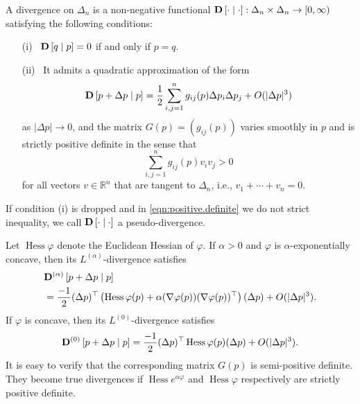 \documentclass[graybox]{svmult}
\newcommand{\Hess}{\operatorname{Hess}}
\begin{document}
\begin{definition} \label{def:divergence}
A divergence on $\Delta_n$ is a non-negative functional ${\bf D}\left[ \cdot \mid \cdot \right] : \Delta_n \times \Delta_n \rightarrow [0, \infty)$ satisfying the following conditions:
\begin{itemize}
\item[(i)] \ ${\bf D}\left[ q \mid p\right] = 0$ if and only if $p = q$.
\item[(ii)] \  It admits a quadratic approximation of the form
\begin{equation} \label{eqn:Riemannian}
{\bf D}\left[p + \Delta p \mid p\right] = \frac{1}{2} \sum_{i, j = 1}^n g_{ij}(p) \Delta p_i \Delta p_j + O(| \Delta p |^3)
\end{equation}
as $|\Delta p| \rightarrow 0$, and the matrix $G(p) = \left( g_{ij}(p) \right)$ varies smoothly in $p$ and is strictly positive definite in the sense that
\begin{equation} \label{eqn:positive.definite}
\sum_{i, j = 1}^n g_{ij}(p) v_i v_j > 0
\end{equation}
for all vectors $v \in \mathbb{R}^n$ that are tangent to $\Delta_n$, i.e., $v_1 + \cdots + v_n = 0$.
\end{itemize}
If condition (i) is dropped and in \eqref{eqn:positive.definite} we do not strict inequality, we call ${\bf D}\left[ \cdot \mid \cdot \right]$ a pseudo-divergence.
\end{definition}

\begin{example}
Let $\Hess \varphi$ denote the Euclidean Hessian of $\varphi$. If $\alpha > 0$ and $\varphi$ is $\alpha$-exponentially concave, then its $L^{(\alpha)}$-divergence satisfies
\begin{equation} \label{eqn:L.alpha.approximation}
\begin{split}
& {\bf D}^{(\alpha)}\left[p + \Delta p \mid p \right] \\
&= \frac{-1}{2} (\Delta p)^{\top} \left( \Hess \varphi(p) + \alpha (\nabla \varphi(p))(\nabla \varphi(p) )^{\top}\right) (\Delta p) + O(|\Delta p|^3).
\end{split}
\end{equation}
If $\varphi$ is concave, then its $L^{(0)}$-divergence satisfies
\[
{\bf D}^{(0)}\left[p + \Delta p \mid p \right] = \frac{-1}{2} (\Delta p)^{\top} \Hess \varphi(p) (\Delta p) + O(|\Delta p|^3).
\]
It is easy to verify that the corresponding matrix $G(p)$ is semi-positive definite. They become true divergences if $\Hess e^{\alpha \varphi}$ and $\Hess \varphi$ respectively are strictly positive definite.
\end{example}
\end{document}
